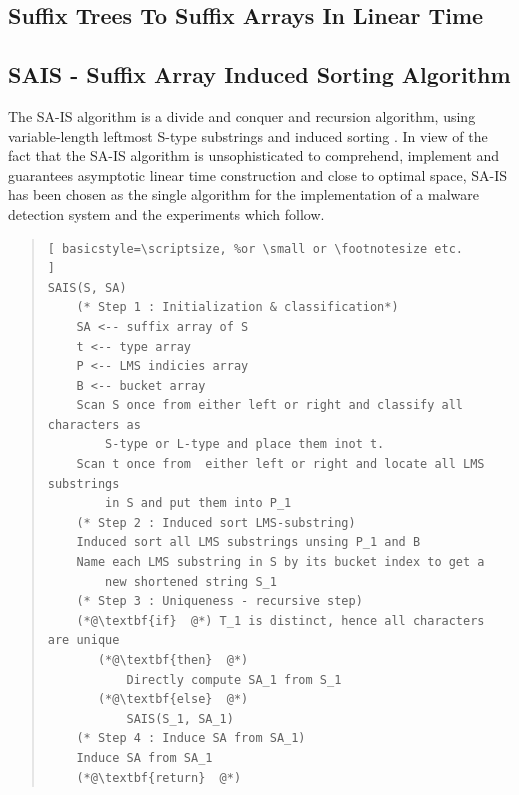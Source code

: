 \documentclass[12pt]{article} %
\begin{document}
\subsection{Suffix Trees To Suffix Arrays In Linear Time}







\subsection{SAIS - Suffix Array Induced Sorting Algorithm}

The SA-IS algorithm  is a divide and conquer and recursion algorithm, using variable-length leftmost S-type substrings and induced sorting \cite{twoeffecient}. In view of the fact that the SA-IS algorithm is unsophisticated to comprehend, implement and guarantees asymptotic linear time construction and close to optimal space,  SA-IS has been chosen as the single algorithm for the implementation of a malware detection system and the experiments which follow. 

\begin{quote}
\begin{lstlisting}[ basicstyle=\scriptsize, %or \small or \footnotesize etc.
]
SAIS(S, SA)
    (* Step 1 : Initialization & classification*)
    SA <-- suffix array of S
    t <-- type array
    P <-- LMS indicies array
    B <-- bucket array
    Scan S once from either left or right and classify all characters as 
        S-type or L-type and place them inot t.
    Scan t once from  either left or right and locate all LMS substrings 
        in S and put them into P_1
    (* Step 2 : Induced sort LMS-substring)
    Induced sort all LMS substrings unsing P_1 and B
    Name each LMS substring in S by its bucket index to get a 
        new shortened string S_1
    (* Step 3 : Uniqueness - recursive step)
    (*@\textbf{if}  @*) T_1 is distinct, hence all characters are unique
       (*@\textbf{then}  @*) 
           Directly compute SA_1 from S_1
       (*@\textbf{else}  @*) 
           SAIS(S_1, SA_1)
    (* Step 4 : Induce SA from SA_1)
    Induce SA from SA_1       
    (*@\textbf{return}  @*) 
\end{lstlisting}
\end{quote}
\end{document}
